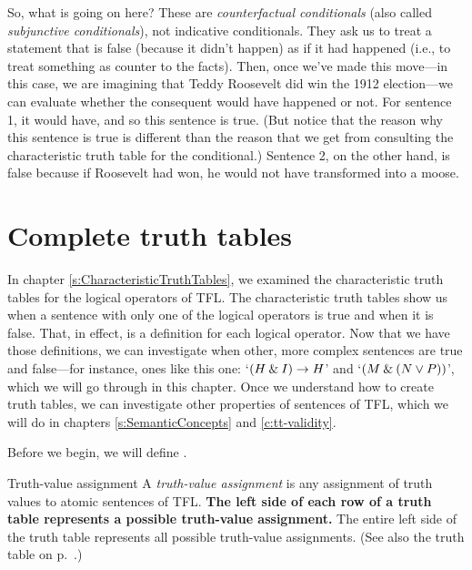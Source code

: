 So, what is going on here? These are \textit{counterfactual conditionals} (also called \textit{subjunctive conditionals}), not indicative conditionals. They ask us to treat a statement that is false (because it didn’t happen) as if it had happened (i.e., to treat something as counter to the facts). Then, once we’ve made this move---in this case, we are imagining that Teddy Roosevelt did win the 1912 election---we can evaluate whether the consequent would have happened or not. For sentence 1, it would have, and so this sentence is true. (But notice that the reason why this sentence is true is different than the reason that we get from consulting the characteristic truth table for the conditional.) Sentence 2, on the other hand, is false because if Roosevelt had won, he would not have transformed into a moose.





\chapter{Complete truth tables}
\label{s:CompleteTruthTables}

In chapter \ref{s:CharacteristicTruthTables}, we examined the characteristic truth tables for the logical operators of TFL. The characteristic truth tables show us when a sentence with only one of the logical operators is true and when it is false. That, in effect, is a definition for each logical operator. Now that we have those definitions, we can investigate when other, more complex sentences are true and false---for instance, ones like this one: `$(H\mathbin{\&} I)\rightarrow H$' and `$(M \mathbin{\&} (N \vee P))$', which we will go through in this chapter. Once we understand how to create truth tables, we can investigate other properties of sentences of TFL, which we will do in chapters \ref{s:SemanticConcepts} and \ref{c:tt-validity}. 

Before we begin, we will define .

\begin{factboxy}{Truth-value assignment}
A \textit{truth-value assignment} is any assignment of truth values to atomic sentences of TFL. \textbf{The left side of each row of a truth table represents a possible truth-value assignment.} The entire left side of the truth table represents all possible truth-value assignments. (See also the truth table on p.~\pageref{truth-value-assignment}.)
\end{factboxy}

